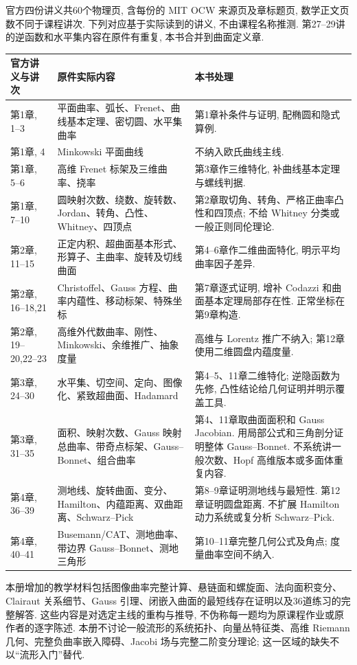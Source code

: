 官方四份讲义共60个物理页, 含每份的 MIT OCW 来源页及章标题页, 数学正文页数不同于课程讲次. 下列对应基于实际读到的讲义, 不由课程名称推测. 第27--29讲的逆函数和水平集内容在原件有重复, 本书合并到曲面定义章.
\begin{longtable}{p{}p{}p{}}
\toprule
官方讲义与讲次 & 原件实际内容 & 本书处理\\
\midrule\endhead
第1章, 1--3 & 平面曲率、弧长、Frenet、曲线基本定理、密切圆、水平集曲率 & 第1章补条件与证明, 配椭圆和隐式算例.\\
第1章, 4 & Minkowski 平面曲线 & 不纳入欧氏曲线主线.\\
第1章, 5--6 & 高维 Frenet 标架及三维曲率、挠率 & 第3章作三维特化, 补曲线基本定理与螺线判据.\\
第1章, 7--10 & 圆映射次数、绕数、旋转数、Jordan、转角、凸性、Whitney、四顶点 & 第2章取切角、转角、严格正曲率凸性和四顶点; 不给 Whitney 分类或一般正则同伦理论.\\
第2章, 11--15 & 正定内积、超曲面基本形式、形算子、主曲率、旋转及切线曲面 & 第4--6章作二维曲面特化, 明示平均曲率因子差异.\\
第2章, 16--18,21 & Christoffel、Gauss 方程、曲率内蕴性、移动标架、特殊坐标 & 第7章逐式证明, 增补 Codazzi 和曲面基本定理局部存在性. 正常坐标在第9章构造.\\
第2章, 19--20,22--23 & 高维外代数曲率、刚性、Minkowski、余维推广、抽象度量 & 高维与 Lorentz 推广不纳入; 第12章使用二维圆盘内蕴度量.\\
第3章, 24--30 & 水平集、切空间、定向、图像化、紧致超曲面、Hadamard & 第4--5、11章二维特化; 逆隐函数为先修, 凸性结论给几何证明并明示覆盖工具.\\
第3章, 31--35 & 面积、映射次数、Gauss 映射总曲率、带奇点标架、Gauss--Bonnet、组合曲率 & 第4、11章取曲面面积和 Gauss Jacobian. 用局部公式和三角剖分证明整体 Gauss--Bonnet. 不系统讲一般次数、Hopf 高维版本或多面体重复内容.\\
第4章, 36--39 & 测地线、旋转曲面、变分、Hamilton、内蕴距离、双曲距离、Schwarz--Pick & 第8--9章证明测地线与最短性. 第12章证明圆盘距离. 不扩展 Hamilton 动力系统或复分析 Schwarz--Pick.\\
第4章, 40--41 & Busemann/CAT、测地曲率、带边界 Gauss--Bonnet、测地三角形 & 第10--11章完整几何公式及角点; 度量曲率空间不纳入.\\
\bottomrule
\end{longtable}
本册增加的教学材料包括图像曲率完整计算、悬链面和螺旋面、法向面积变分、Clairaut 关系细节、Gauss 引理、闭嵌入曲面的最短线存在证明以及36道练习的完整解答. 这些内容是对选定主线的重构与推导, 不伪称每一题均为原课程作业或原作者的逐字陈述. 本册不讨论一般流形的系统拓扑、向量丛特征类、高维 Riemann 几何、完整负曲率嵌入障碍、Jacobi 场与完整二阶变分理论; 这一区域的缺失不以“流形入门”替代.

